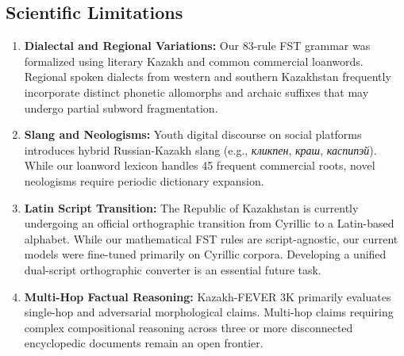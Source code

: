 \subsection{Scientific Limitations}
\begin{enumerate}
    \item \textbf{Dialectal and Regional Variations:} Our 83-rule FST grammar was formalized using literary Kazakh and common commercial loanwords. Regional spoken dialects from western and southern Kazakhstan frequently incorporate distinct phonetic allomorphs and archaic suffixes that may undergo partial subword fragmentation.
    \item \textbf{Slang and Neologisms:} Youth digital discourse on social platforms introduces hybrid Russian-Kazakh slang (e.g., \textit{кликпен}, \textit{краш}, \textit{каспипэй}). While our loanword lexicon handles 45 frequent commercial roots, novel neologisms require periodic dictionary expansion.
    \item \textbf{Latin Script Transition:} The Republic of Kazakhstan is currently undergoing an official orthographic transition from Cyrillic to a Latin-based alphabet. While our mathematical FST rules are script-agnostic, our current models were fine-tuned primarily on Cyrillic corpora. Developing a unified dual-script orthographic converter is an essential future task.
    \item \textbf{Multi-Hop Factual Reasoning:} Kazakh-FEVER 3K primarily evaluates single-hop and adversarial morphological claims. Multi-hop claims requiring complex compositional reasoning across three or more disconnected encyclopedic documents remain an open frontier.
\end{enumerate}

